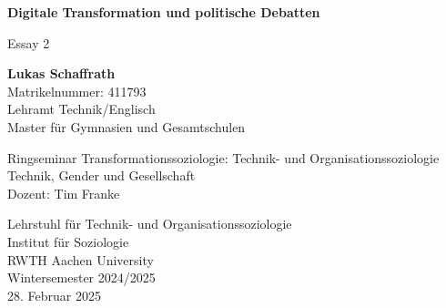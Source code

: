 \documentclass[12pt]{article}
\begin{document}
\thispagestyle{empty}
    \begin{center}
            
        \LARGE
        \textbf{Digitale Transformation und politische Debatten}
            
        \vspace{0.2cm}
        \Large
        Essay 2

        \vspace{2cm}
            
        \textbf{Lukas Schaffrath}\\
        Matrikelnummer: 411793\\
        Lehramt Technik/Englisch\\
        Master für Gymnasien und Gesamtschulen
            
        \vspace{2cm}
            
        Ringseminar Transformationssoziologie: Technik- und Organisationssoziologie\\
        Technik, Gender und Gesellschaft\\
        Dozent: Tim Franke
            
        \vspace{2cm}
            
            
        \Large
        Lehrstuhl für Technik- und Organisationssoziologie\\
        Institut für Soziologie\\
        RWTH Aachen University\\
        Wintersemester 2024/2025\\
        28. Februar 2025
            
    \end{center}




\newpage
\setcounter{page}{1}
\pagestyle{maintext}


\end{document}
